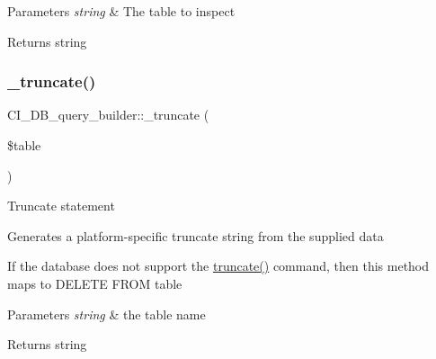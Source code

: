 \begin{DoxyParams}{Parameters}
{\em string} & The table to inspect \\
\hline
\end{DoxyParams}
\begin{DoxyReturn}{Returns}
string 
\end{DoxyReturn}
\mbox{\label{class_c_i___d_b__query__builder_a057560cdbf8c8e85ca668d81a2e8c81c}} 
\subsubsection{\texorpdfstring{\+\_\+truncate()}{\_truncate()}}
{\footnotesize\ttfamily C\+I\+\_\+\+D\+B\+\_\+query\+\_\+builder\+::\+\_\+truncate (\begin{DoxyParamCaption}\item[{}]{\$table }\end{DoxyParamCaption})\hspace{0.3cm}{\ttfamily [protected]}}

Truncate statement

Generates a platform-\/specific truncate string from the supplied data

If the database does not support the \mbox{\hyperlink{class_c_i___d_b__query__builder_a6fb8a3114ae1460cd9ecf4a328812d31}{truncate()}} command, then this method maps to \textquotesingle{}D\+E\+L\+E\+TE F\+R\+OM table\textquotesingle{}


\begin{DoxyParams}{Parameters}
{\em string} & the table name \\
\hline
\end{DoxyParams}
\begin{DoxyReturn}{Returns}
string 
\end{DoxyReturn}
\mbox{\label{class_c_i___d_b__query__builder_a861b73c482de70dbd12d0b6fe11a5d4c}} 
